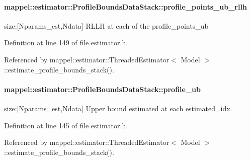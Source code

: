 \paragraph[{\texorpdfstring{profile\+\_\+points\+\_\+ub\+\_\+rllh}{profile_points_ub_rllh}}]{ mappel\+::estimator\+::\+Profile\+Bounds\+Data\+Stack\+::profile\+\_\+points\+\_\+ub\+\_\+rllh}\hypertarget{structmappel_1_1estimator_1_1ProfileBoundsDataStack_a9f2c221a0b1b9b60c4422bfa8e588166}{}\label{structmappel_1_1estimator_1_1ProfileBoundsDataStack_a9f2c221a0b1b9b60c4422bfa8e588166}


size\+:\mbox{[}Nparams\+\_\+est,Ndata\mbox{]} R\+L\+LH at each of the profile\+\_\+points\+\_\+ub 



Definition at line 149 of file estimator.\+h.



Referenced by mappel\+::estimator\+::\+Threaded\+Estimator$<$ Model $>$\+::estimate\+\_\+profile\+\_\+bounds\+\_\+stack().

\paragraph[{\texorpdfstring{profile\+\_\+ub}{profile_ub}}]{ mappel\+::estimator\+::\+Profile\+Bounds\+Data\+Stack\+::profile\+\_\+ub}\hypertarget{structmappel_1_1estimator_1_1ProfileBoundsDataStack_ae9c006b881ba89bd13bb2a5368819dbe}{}\label{structmappel_1_1estimator_1_1ProfileBoundsDataStack_ae9c006b881ba89bd13bb2a5368819dbe}


size\+:\mbox{[}Nparams\+\_\+est,Ndata\mbox{]} Upper bound estimated at each estimated\+\_\+idx. 



Definition at line 145 of file estimator.\+h.



Referenced by mappel\+::estimator\+::\+Threaded\+Estimator$<$ Model $>$\+::estimate\+\_\+profile\+\_\+bounds\+\_\+stack().

